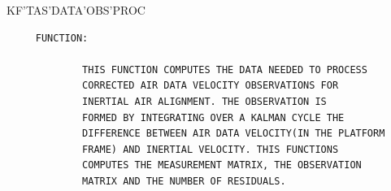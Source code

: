 \begin{frame}
KF'TAS'DATA'OBS'PROC
\begin{verbatim}
     FUNCTION:

             THIS FUNCTION COMPUTES THE DATA NEEDED TO PROCESS
             CORRECTED AIR DATA VELOCITY OBSERVATIONS FOR
             INERTIAL AIR ALIGNMENT. THE OBSERVATION IS
             FORMED BY INTEGRATING OVER A KALMAN CYCLE THE
             DIFFERENCE BETWEEN AIR DATA VELOCITY(IN THE PLATFORM
             FRAME) AND INERTIAL VELOCITY. THIS FUNCTIONS
             COMPUTES THE MEASUREMENT MATRIX, THE OBSERVATION
             MATRIX AND THE NUMBER OF RESIDUALS.


\end{verbatim}
\end{frame}

